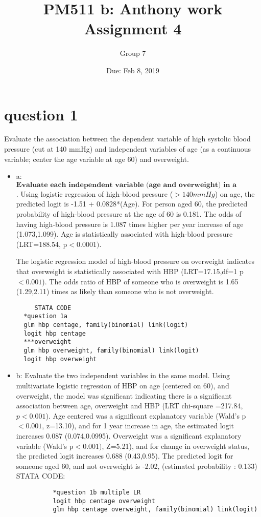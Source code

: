 \documentclass{article}
\title{PM511 b: Anthony work Assignment 4}
\author{Group 7}
\date{Due: Feb 8, 2019}
\begin{document}
\selectfont

\maketitle

\section{question 1}
 Evaluate the association between the dependent variable of high systolic blood pressure (cut at 140 mmHg) and independent variables of age (as a continuous variable; center the age variable at age 60) and overweight.
 \begin{itemize}
     \item a:  $\textbf{Evaluate each independent variable (age and overweight) in a separate model}$.  Using logistic regression of high-blood pressure ($>140mmHg$) on age, the predicted logit is -1.51 + 0.0828*(Age). For person aged 60, the predicted probability of high-blood pressure at the age of 60 is 0.181.   The odds of having high-blood pressure is 1.087 times higher per year increase of age (1.073,1.099).  Age is statistically associated with high-blood pressure (LRT=188.54, p$<0.0001)$.
     
      The logistic regression model of high-blood pressure on overweight indicates that overweight is statistically associated with HBP (LRT=17.15,df=1 p$<0.001$).  The odds ratio of HBP of someone who is overweight is 1.65 (1.29,2.11) times as likely than someone who is not overweight.
     \begin{verbatim}
     STATA CODE
  *question 1a
  glm hbp centage, family(binomial) link(logit)
  logit hbp centage
  ***overweight
  glm hbp overweight, family(binomial) link(logit)	
  logit hbp overweight
     \end{verbatim}
     \item b:  Evaluate the two independent variables in the same model.
     Using multivariate logistic regression of HBP on age (centered on 60), and overweight, the model was significant indicating there is a significant association between age, overweight and HBP (LRT chi-square =217.84, $p<0.001$).  Age centered was a significant explanatory variable (Wald's p$<0.001$, z=13.10), and for 1 year increase in age, the estimated logit increases 0.087 (0.074,0.0995).  Overweight was a significant explanatory variable (Wald's p$<0.001)$, Z=5.21), and for change in overweight status, the predicted logit increases 0.688 (0.43,0.95).  The predicted logit for someone aged 60, and not overweight is -2.02, (estimated probability : 0.133)
    STATA CODE:
     \begin{verbatim}
          *question 1b multiple LR
          logit hbp centage overweight
          glm hbp centage overweight, family(binomial) link(logit)
     \end{verbatim}
     

\end{itemize}
\end{document}

